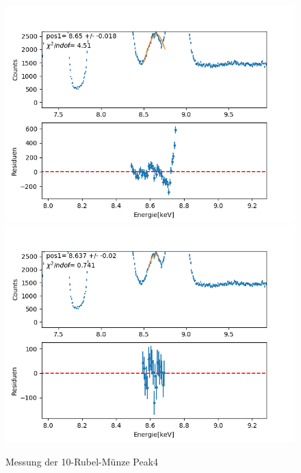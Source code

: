 \documentclass[12pt,a4paper]{article}
\begin{document}
\begin{figure}[H]
\centering
\includegraphics[scale=0.49]{Bilder/roentgen_spektren/rubel/rub5_1.png}
\includegraphics[scale=0.49]{Bilder/roentgen_spektren/rubel/rub5_2.png}
\caption{Messung der 10-Rubel-Münze Peak4}
\end{figure}
\end{document}

